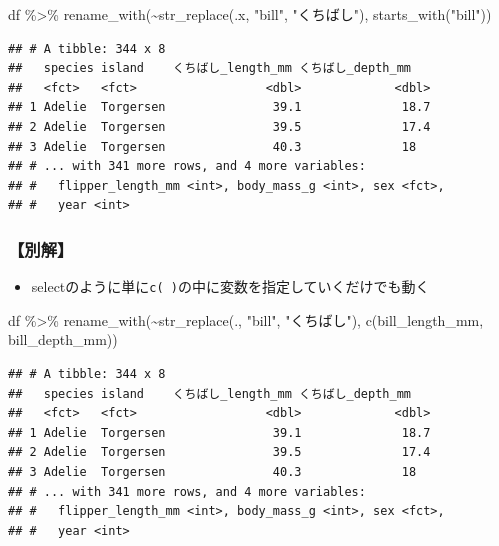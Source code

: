 \documentclass[
  xelatex,ja=standard, b5paper]{bxjsbook}
\newenvironment{Shaded}{\begin{snugshade}}{\end{snugshade}}
\newcommand{\FunctionTok}[1]{\textcolor[rgb]{0.00,0.00,0.00}{#1}}
\newcommand{\NormalTok}[1]{#1}
\newcommand{\SpecialCharTok}[1]{\textcolor[rgb]{0.00,0.00,0.00}{#1}}
\newcommand{\StringTok}[1]{\textcolor[rgb]{0.31,0.60,0.02}{#1}}
\providecommand{\tightlist}{%
  \setlength{\itemsep}{0pt}\setlength{\parskip}{0pt}}
\begin{document}
\begin{Shaded}
\begin{Highlighting}[]
\NormalTok{df }\SpecialCharTok{\%\textgreater{}\%} 
  \FunctionTok{rename\_with}\NormalTok{(}\SpecialCharTok{\textasciitilde{}}\FunctionTok{str\_replace}\NormalTok{(.x, }\StringTok{"bill"}\NormalTok{, }\StringTok{"くちばし"}\NormalTok{),}
              \FunctionTok{starts\_with}\NormalTok{(}\StringTok{"bill"}\NormalTok{))}
\end{Highlighting}
\end{Shaded}

\begin{verbatim}
## # A tibble: 344 x 8
##   species island    くちばし_length_mm くちばし_depth_mm
##   <fct>   <fct>                  <dbl>             <dbl>
## 1 Adelie  Torgersen               39.1              18.7
## 2 Adelie  Torgersen               39.5              17.4
## 3 Adelie  Torgersen               40.3              18  
## # ... with 341 more rows, and 4 more variables:
## #   flipper_length_mm <int>, body_mass_g <int>, sex <fct>,
## #   year <int>
\end{verbatim}

\hypertarget{rename-strreplace1-other}{%
\subsubsection{【別解】}\label{rename-strreplace1-other}}

\begin{itemize}
\tightlist
\item
  selectのように単に\texttt{c(\ )}の中に変数を指定していくだけでも動く
\end{itemize}

\begin{Shaded}
\begin{Highlighting}[]
\NormalTok{df }\SpecialCharTok{\%\textgreater{}\%} 
  \FunctionTok{rename\_with}\NormalTok{(}\SpecialCharTok{\textasciitilde{}}\FunctionTok{str\_replace}\NormalTok{(., }\StringTok{"bill"}\NormalTok{, }\StringTok{"くちばし"}\NormalTok{),}
              \FunctionTok{c}\NormalTok{(bill\_length\_mm, bill\_depth\_mm))}
\end{Highlighting}
\end{Shaded}

\begin{verbatim}
## # A tibble: 344 x 8
##   species island    くちばし_length_mm くちばし_depth_mm
##   <fct>   <fct>                  <dbl>             <dbl>
## 1 Adelie  Torgersen               39.1              18.7
## 2 Adelie  Torgersen               39.5              17.4
## 3 Adelie  Torgersen               40.3              18  
## # ... with 341 more rows, and 4 more variables:
## #   flipper_length_mm <int>, body_mass_g <int>, sex <fct>,
## #   year <int>
\end{verbatim}
\end{document}
